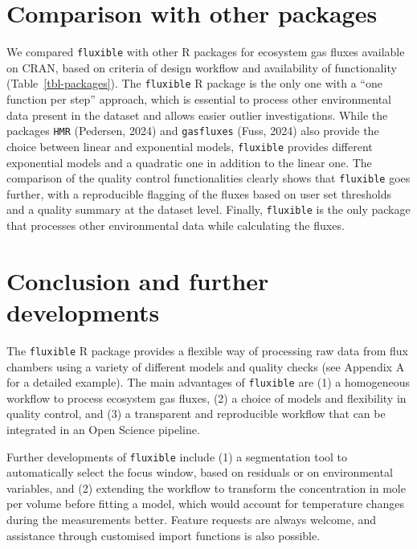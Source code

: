 \documentclass[
  letterpaper,
  DIV=11,
  numbers=noendperiod]{scrartcl}
\begin{document}
\section{Comparison with other
packages}\label{comparison-with-other-packages}

We compared \texttt{fluxible} with other R packages for ecosystem gas
fluxes available on CRAN, based on criteria of design workflow and
availability of functionality (Table~\ref{tbl-packages}). The
\texttt{fluxible} R package is the only one with a ``one function per
step'' approach, which is essential to process other environmental data
present in the dataset and allows easier outlier investigations. While
the packages \texttt{HMR} (Pedersen, 2024) and \texttt{gasfluxes} (Fuss,
2024) also provide the choice between linear and exponential models,
\texttt{fluxible} provides different exponential models and a quadratic
one in addition to the linear one. The comparison of the quality control
functionalities clearly shows that \texttt{fluxible} goes further, with
a reproducible flagging of the fluxes based on user set thresholds and a
quality summary at the dataset level. Finally, \texttt{fluxible} is the
only package that processes other environmental data while calculating
the fluxes.

\section{Conclusion and further
developments}\label{conclusion-and-further-developments}

The \texttt{fluxible} R package provides a flexible way of processing
raw data from flux chambers using a variety of different models and
quality checks (see Appendix A for a detailed example). The main
advantages of \texttt{fluxible} are (1) a homogeneous workflow to
process ecosystem gas fluxes, (2) a choice of models and flexibility in
quality control, and (3) a transparent and reproducible workflow that
can be integrated in an Open Science pipeline.

Further developments of \texttt{fluxible} include (1) a segmentation
tool to automatically select the focus window, based on residuals or on
environmental variables, and (2) extending the workflow to transform the
concentration in mole per volume before fitting a model, which would
account for temperature changes during the measurements better. Feature
requests are always welcome, and assistance through customised import
functions is also possible.
\end{document}
